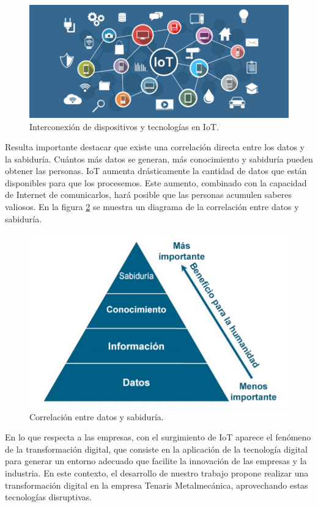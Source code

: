 \begin{figure}[ht]
	\centering
	\includegraphics[width=1\textwidth]{./Figures/iot.png}
	\caption{Interconexión de dispositivos y tecnologías en IoT.}
	\label{fig:Iot}
\end{figure}

Resulta importante destacar que existe una correlación directa entre los datos y la sabiduría. Cuántos más datos se generan, más conocimiento y sabiduría pueden obtener las personas. IoT aumenta drásticamente la cantidad de datos que están disponibles para que los procesemos. Este aumento, combinado con la capacidad de Internet de comunicarlos, hará posible que las personas acumulen saberes valiosos. En la figura \ref{fig:Sabiduria} se muestra un diagrama de la correlación entre datos y sabiduría.

\begin{figure}[ht]
	\centering
	\includegraphics[width=1\textwidth]{./Figures/sabiduria.png}
	\caption{Correlación entre datos y sabiduría.}
	\label{fig:Sabiduria}
\end{figure}

En lo que respecta a las empresas, con el surgimiento de IoT aparece el fenómeno de la transformación digital, que consiste en la aplicación de la tecnología digital para generar un entorno adecuado que facilite la innovación de las empresas y la industria. En este contexto, el desarrollo de nuestro trabajo propone realizar una transformación digital en la empresa Tenaris Metalmecánica, aprovechando estas tecnologías disruptivas.

